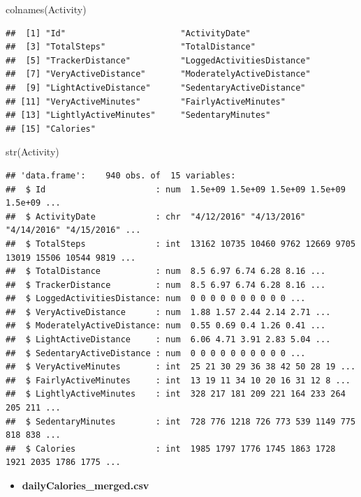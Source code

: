 \documentclass[
]{article}
\newenvironment{Shaded}{\begin{snugshade}}{\end{snugshade}}
\newcommand{\FunctionTok}[1]{\textcolor[rgb]{0.00,0.00,0.00}{#1}}
\newcommand{\NormalTok}[1]{#1}
\providecommand{\tightlist}{%
  \setlength{\itemsep}{0pt}\setlength{\parskip}{0pt}}
\begin{document}
\begin{Shaded}
\begin{Highlighting}[]
\FunctionTok{colnames}\NormalTok{(Activity)}
\end{Highlighting}
\end{Shaded}

\begin{verbatim}
##  [1] "Id"                       "ActivityDate"            
##  [3] "TotalSteps"               "TotalDistance"           
##  [5] "TrackerDistance"          "LoggedActivitiesDistance"
##  [7] "VeryActiveDistance"       "ModeratelyActiveDistance"
##  [9] "LightActiveDistance"      "SedentaryActiveDistance" 
## [11] "VeryActiveMinutes"        "FairlyActiveMinutes"     
## [13] "LightlyActiveMinutes"     "SedentaryMinutes"        
## [15] "Calories"
\end{verbatim}

\begin{Shaded}
\begin{Highlighting}[]
\FunctionTok{str}\NormalTok{(Activity)}
\end{Highlighting}
\end{Shaded}

\begin{verbatim}
## 'data.frame':    940 obs. of  15 variables:
##  $ Id                      : num  1.5e+09 1.5e+09 1.5e+09 1.5e+09 1.5e+09 ...
##  $ ActivityDate            : chr  "4/12/2016" "4/13/2016" "4/14/2016" "4/15/2016" ...
##  $ TotalSteps              : int  13162 10735 10460 9762 12669 9705 13019 15506 10544 9819 ...
##  $ TotalDistance           : num  8.5 6.97 6.74 6.28 8.16 ...
##  $ TrackerDistance         : num  8.5 6.97 6.74 6.28 8.16 ...
##  $ LoggedActivitiesDistance: num  0 0 0 0 0 0 0 0 0 0 ...
##  $ VeryActiveDistance      : num  1.88 1.57 2.44 2.14 2.71 ...
##  $ ModeratelyActiveDistance: num  0.55 0.69 0.4 1.26 0.41 ...
##  $ LightActiveDistance     : num  6.06 4.71 3.91 2.83 5.04 ...
##  $ SedentaryActiveDistance : num  0 0 0 0 0 0 0 0 0 0 ...
##  $ VeryActiveMinutes       : int  25 21 30 29 36 38 42 50 28 19 ...
##  $ FairlyActiveMinutes     : int  13 19 11 34 10 20 16 31 12 8 ...
##  $ LightlyActiveMinutes    : int  328 217 181 209 221 164 233 264 205 211 ...
##  $ SedentaryMinutes        : int  728 776 1218 726 773 539 1149 775 818 838 ...
##  $ Calories                : int  1985 1797 1776 1745 1863 1728 1921 2035 1786 1775 ...
\end{verbatim}

\begin{itemize}
\tightlist
\item
  \textbf{dailyCalories\_merged.csv}
\end{itemize}
\end{document}
